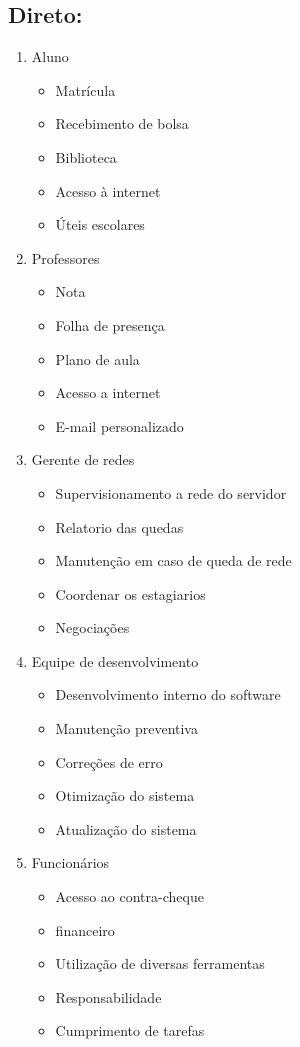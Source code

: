 	\subsection {Direto:}
	\begin{enumerate}
	\item Aluno
		\begin{itemize}
		\item Matrícula
		\item Recebimento de bolsa
		\item Biblioteca
		\item Acesso à internet
		\item Úteis escolares
		\end{itemize}
		
	\item Professores
	    \begin{itemize}
		\item Nota
		\item Folha de presença
		\item Plano de aula
		\item Acesso a internet
		\item E-mail personalizado
		\end{itemize}
		
	\item Gerente de redes
		\begin{itemize}
		\item Supervisionamento a rede do servidor
		\item Relatorio das quedas
		\item Manutenção em caso de queda de rede
		\item Coordenar os estagiarios
		\item Negociações
		\end{itemize}
		
	\item Equipe de desenvolvimento
		\begin{itemize}
		\item Desenvolvimento interno do software
		\item Manutenção preventiva
		\item Correções de erro
		\item Otimização do sistema
		\item Atualização do sistema
		\end{itemize}
		
	\item Funcionários
		\begin{itemize}		
		\item Acesso ao contra-cheque
		\item financeiro
		\item Utilização de diversas ferramentas
		\item Responsabilidade
		\item Cumprimento de tarefas
		\end{itemize}
	

\end{enumerate}
